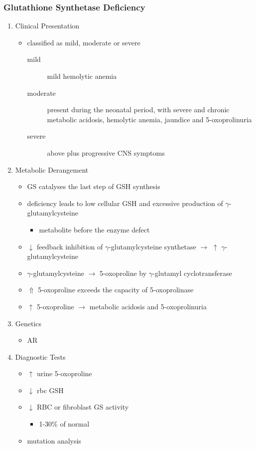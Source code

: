 \documentclass{scrartcl}
\begin{document}
\subsubsection{Glutathione Synthetase Deficiency}
\label{sec:orgea62241}
\begin{enumerate}
\item Clinical Presentation
\label{sec:org4fae4a2}
\begin{itemize}
\item classified as mild, moderate or severe
\begin{description}
\item[{mild}] mild hemolytic anemia
\item[{moderate}] present during the neonatal period, with severe and
chronic metabolic acidosis, hemolytic anemia, jaundice
and 5-oxoprolinuria
\item[{severe}] above plus progressive CNS symptoms
\end{description}
\end{itemize}

\item Metabolic Derangement
\label{sec:org0b0f610}
\begin{itemize}
\item GS catalyses the last step of GSH synthesis
\item deficiency leads to low cellular GSH and excessive production of
\(\gamma\)-glutamylcysteine
\begin{itemize}
\item metabolite before the enzyme defect
\end{itemize}
\item \(\downarrow\) feedback inhibition of \(\gamma\)-glutamylcysteine synthetase
\(\to\) \(\uparrow\) \(\gamma\)-glutamylcysteine
\item \(\gamma\)-glutamylcysteine \(\to\) 5-oxoproline by \(\gamma\)-glutamyl
cyclotransferase
\item \(\Uparrow\) 5-oxoproline exceeds the capacity of 5-oxoprolinase
\item \(\uparrow\) 5-oxoproline \(\to\) metabolic acidosis and 5-oxoprolinuria
\end{itemize}

\item Genetics
\label{sec:org342343f}
\begin{itemize}
\item AR
\end{itemize}

\item Diagnostic Tests
\label{sec:org3162037}
\begin{itemize}
\item \(\uparrow\) urine 5-oxoproline
\item \(\downarrow\) rbc GSH
\item \(\downarrow\) RBC or fibroblast GS activity
\begin{itemize}
\item 1-30\% of normal
\end{itemize}
\item mutation analysis
\end{itemize}


\end{enumerate}
\end{document}
